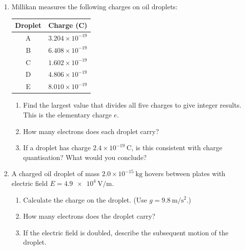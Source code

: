 \documentclass[12pt, a4paper]{book}
\theoremstyle{definition}
\begin{document}
\begin{problembox}
\begin{enumerate}[label=\textbf{\arabic*.}]
  \item Millikan measures the following charges on oil droplets:
        \begin{center}
        \begin{tabular}{cc}
        \toprule
        Droplet & Charge (\si{\coulomb}) \\
        \midrule
        A & $3.204 \times 10^{-19}$ \\
        B & $6.408 \times 10^{-19}$ \\
        C & $1.602 \times 10^{-19}$ \\
        D & $4.806 \times 10^{-19}$ \\
        E & $8.010 \times 10^{-19}$ \\
        \bottomrule
        \end{tabular}
        \end{center}
        \begin{enumerate}[label=(\alph*)]
          \item Find the largest value that divides all
                five charges to give integer results.
                This is the elementary charge $e$.
          \item How many electrons does each droplet carry?
          \item If a droplet has charge $2.4\times10^{-19}\ \si{\coulomb}$,
                is this consistent with charge quantisation?
                What would you conclude?
        \end{enumerate}

  \item A charged oil droplet of mass
        $2.0 \times 10^{-15}\ \si{\kilogram}$
        hovers between plates with electric field
        $E = \SI{4.9e4}{\volt\per\metre}$.
        \begin{enumerate}[label=(\alph*)]
          \item Calculate the charge on the droplet.
                (Use $g = \SI{9.8}{\metre\per\second\squared}$.)
          \item How many electrons does the droplet carry?
          \item If the electric field is doubled,
                describe the subsequent motion of the droplet.
        \end{enumerate}
\end{enumerate}
\end{problembox}
\end{document}
